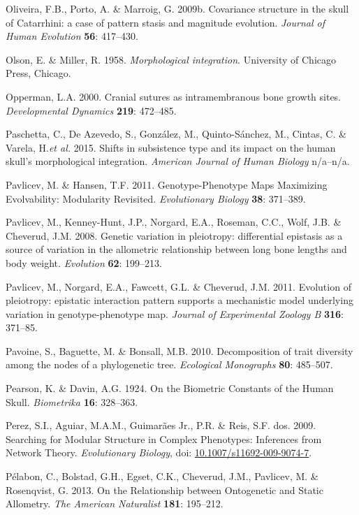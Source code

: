\documentclass[12pt,twoside]{report}
\begin{document}
Oliveira, F.B., Porto, A. \& Marroig, G. 2009b. Covariance structure in
the skull of Catarrhini: a case of pattern stasis and magnitude
evolution. \emph{Journal of Human Evolution} \textbf{56}: 417--430.

Olson, E. \& Miller, R. 1958. \emph{Morphological integration}.
University of Chicago Press, Chicago.

Opperman, L.A. 2000. Cranial sutures as intramembranous bone growth
sites. \emph{Developmental Dynamics} \textbf{219}: 472--485.

Paschetta, C., De Azevedo, S., González, M., Quinto-Sánchez, M., Cintas,
C. \& Varela, H.\emph{et al.} 2015. Shifts in subsistence type and its
impact on the human skull's morphological integration. \emph{American
Journal of Human Biology} n/a--n/a.

Pavlicev, M. \& Hansen, T.F. 2011. Genotype-Phenotype Maps Maximizing
Evolvability: Modularity Revisited. \emph{Evolutionary Biology}
\textbf{38}: 371--389.

Pavlicev, M., Kenney-Hunt, J.P., Norgard, E.A., Roseman, C.C., Wolf,
J.B. \& Cheverud, J.M. 2008. Genetic variation in pleiotropy:
differential epistasis as a source of variation in the allometric
relationship between long bone lengths and body weight. \emph{Evolution}
\textbf{62}: 199--213.

Pavlicev, M., Norgard, E.A., Fawcett, G.L. \& Cheverud, J.M. 2011.
Evolution of pleiotropy: epistatic interaction pattern supports a
mechanistic model underlying variation in genotype-phenotype map.
\emph{Journal of Experimental Zoology B} \textbf{316}: 371--85.

Pavoine, S., Baguette, M. \& Bonsall, M.B. 2010. Decomposition of trait
diversity among the nodes of a phylogenetic tree. \emph{Ecological
Monographs} \textbf{80}: 485--507.

Pearson, K. \& Davin, A.G. 1924. On the Biometric Constants of the Human
Skull. \emph{Biometrika} \textbf{16}: 328--363.

Perez, S.I., Aguiar, M.A.M., Guimarães Jr., P.R. \& Reis, S.F. dos.
2009. Searching for Modular Structure in Complex Phenotypes: Inferences
from Network Theory. \emph{Evolutionary Biology}, doi:
\href{http://dx.doi.org/10.1007/s11692-009-9074-7}{10.1007/s11692-009-9074-7}.

Pélabon, C., Bolstad, G.H., Egset, C.K., Cheverud, J.M., Pavlicev, M. \&
Rosenqvist, G. 2013. On the Relationship between Ontogenetic and Static
Allometry. \emph{The American Naturalist} \textbf{181}: 195--212.
\end{document}
